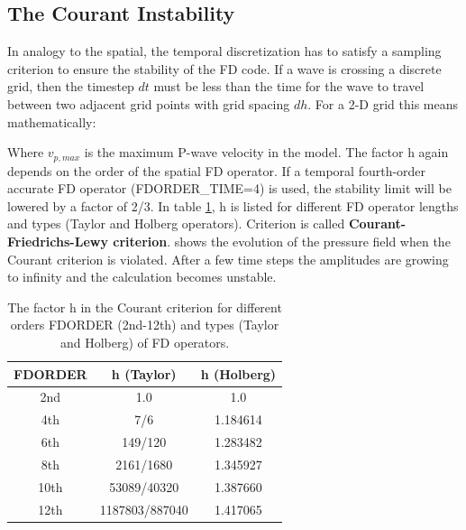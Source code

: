 \documentclass[11pt,onecolumn,oneside]{article}
\begin{document}
\clearpage
\subsection{The Courant Instability}\label{courandt}
In analogy to the spatial, the temporal discretization has to satisfy a sampling criterion to ensure the stability of the FD code. If a  wave is crossing a discrete grid, then the timestep $dt$ must be less than the time for the wave to travel between two adjacent grid  points with grid spacing $dh$. For a 2-D grid this means mathematically: 


Where $v_{p,max}$ is the maximum P-wave velocity in the model. The factor h again depends on the order of the spatial FD operator. If a temporal fourth-order accurate FD operator (FDORDER\_TIME=4) is used, the stability limit will be lowered by a factor of 2/3. In table  \ref{courant.1}, h is listed for different FD operator lengths and types (Taylor and Holberg operators). Criterion  is called {\bf{Courant-Friedrichs-Lewy criterion}}.  shows the evolution of the pressure field when the Courant 
criterion is violated. After a few time steps the amplitudes are growing to infinity and the calculation becomes unstable.

\begin{table}[hbt]
\begin{center}
\begin{tabular}{ccc}\hline \hline
FDORDER & h (Taylor)      & h (Holberg) \\ \hline 
2nd   &   1.0             &  1.0        \\
4th   &   7/6             &  1.184614   \\
6th   &   149/120         &  1.283482   \\
8th   &   2161/1680       &  1.345927   \\
10th  &   53089/40320     &  1.387660   \\
12th  &   1187803/887040  &  1.417065   \\   
\hline \hline
\end{tabular}
\caption{\label{courant.1} The factor h in the Courant criterion for different orders FDORDER (2nd-12th) and types (Taylor and Holberg) of FD operators.}
\end{center}
\end{table} 
\end{document}
